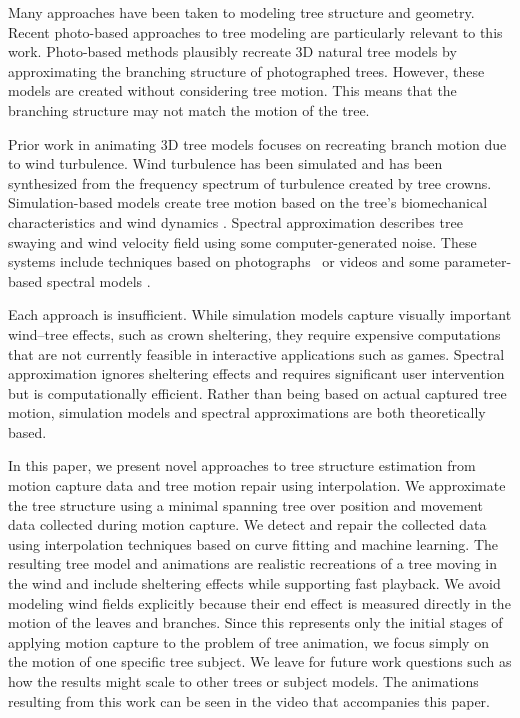 Many approaches have been taken to modeling tree structure and geometry. Recent photo-based approaches to tree modeling \cite{neubert:acmtg07,RecheMartinez2004,Tan:2007:ITM} are particularly relevant to this work. Photo-based methods plausibly recreate 3D natural tree models by approximating the branching structure of photographed trees. However, these models are created without considering tree motion. This means that the branching structure may not match the motion of the tree. 

Prior work in animating 3D tree models focuses on recreating branch motion due to wind turbulence. Wind turbulence has been simulated and has been synthesized from the frequency spectrum of turbulence created by tree crowns. Simulation-based models create tree motion based on the tree's biomechanical characteristics and wind dynamics \cite{Akagi:cg06,Habel09PGT}. Spectral approximation describes tree swaying and wind velocity field using some computer-generated noise. These systems include techniques based on photographs~\cite{wu:cas99} or videos \cite{Diener:2006} and some parameter-based spectral models \cite{Habel09PGT,shinya:eu92}.

Each approach is insufficient. While simulation models capture visually important wind--tree effects, such as crown sheltering, they require expensive computations that are not currently feasible in interactive applications such as games. Spectral approximation ignores sheltering effects and requires significant user intervention but is computationally efficient. Rather than being based on actual captured tree motion, simulation models and spectral approximations are both theoretically based.

In this paper, we present novel approaches to tree structure estimation from motion capture data and tree motion repair using interpolation. We approximate the tree structure using a minimal spanning tree over position and movement data collected during motion capture. We detect and repair the collected data using interpolation techniques based on curve fitting and machine learning. The resulting tree model and animations are realistic recreations of a tree moving in the wind and include sheltering effects while supporting fast playback. We avoid modeling wind fields explicitly because their end effect is measured directly in the motion of the leaves and branches. Since this represents only the initial stages of applying motion capture to the problem of tree animation, we focus simply on the motion of one specific tree subject. We leave for future work questions such as how the results might scale to other trees or subject models. The animations resulting from this work can be seen in the video that accompanies this paper.
% 

